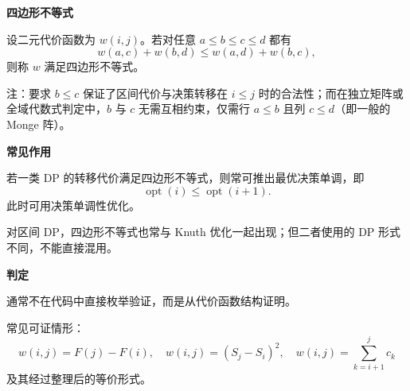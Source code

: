 \textbf{四边形不等式}

设二元代价函数为 $w(i,j)$。若对任意 $a\le b\le c\le d$ 都有
\[
w(a,c)+w(b,d)\le w(a,d)+w(b,c),
\]
则称 $w$ 满足四边形不等式。

注：要求 $b\le c$ 保证了区间代价与决策转移在 $i\le j$ 时的合法性；而在独立矩阵或全域代数式判定中，$b$ 与 $c$ 无需互相约束，仅需行 $a\le b$ 且列 $c\le d$（即一般的 Monge 阵）。

\textbf{常见作用}

若一类 DP 的转移代价满足四边形不等式，则常可推出最优决策单调，即
\[
\operatorname{opt}(i)\le \operatorname{opt}(i+1).
\]
此时可用决策单调性优化。

对区间 DP，四边形不等式也常与 Knuth 优化一起出现；但二者使用的 DP 形式不同，不能直接混用。

\textbf{判定}

通常不在代码中直接枚举验证，而是从代价函数结构证明。

常见可证情形：
\[
w(i,j)=F(j)-F(i),\quad
w(i,j)=(S_j-S_i)^2,\quad
w(i,j)=\sum_{k=i+1}^{j} c_k
\]
及其经过整理后的等价形式。
